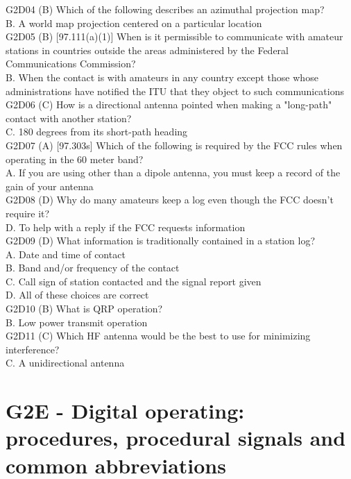 \documentclass[12pt,letterpaper]{report}
\begin{document}
G2D04 (B) Which of the following describes an azimuthal projection map?\\
B. A world map projection centered on a particular location \\

G2D05 (B) [97.111(a)(1)] When is it permissible to communicate with amateur stations in countries outside the areas administered by the Federal Communications Commission?\\
B. When the contact is with amateurs in any country except those whose administrations have notified the ITU that they object to such communications\\

G2D06 (C) How is a directional antenna pointed when making a "long-path" contact with another station?\\
C. 180 degrees from its short-path heading\\

G2D07 (A) [97.303s] Which of the following is required by the FCC rules when operating in the 60 meter band?\\
A. If you are using other than a dipole antenna, you must keep a record of the gain of your antenna\\

G2D08 (D) Why do many amateurs keep a log even though the FCC doesn't require it?\\
D. To help with a reply if the FCC requests information\\

G2D09 (D) What information is traditionally contained in a station log?\\
A. Date and time of contact\\
B. Band and/or frequency of the contact \\
C. Call sign of station contacted and the signal report given \\
D. All of these choices are correct\\

G2D10 (B) What is QRP operation?\\
B. Low power transmit operation\\

G2D11 (C) Which HF antenna would be the best to use for minimizing interference?\\
C. A unidirectional antenna\\

\section{G2E - Digital operating: procedures, procedural signals and common abbreviations}
\end{document}
